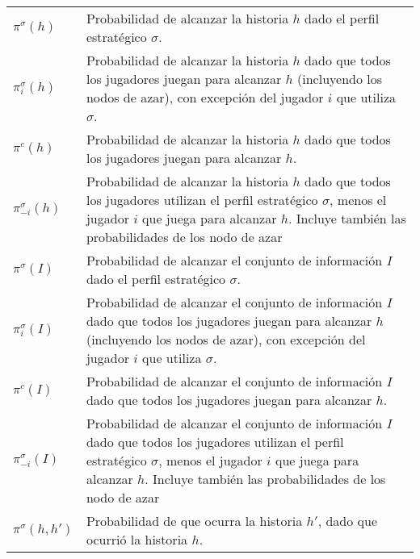 \begingroup
\renewcommand{\arraystretch}{1.5}
\begin{tabular}{l p{12cm}}
$\pi^{\sigma}(h)$ & Probabilidad de alcanzar la historia $h$ dado el perfil estratégico $\sigma$. \\
$\pi^{\sigma}_i(h)$ & Probabilidad de alcanzar la historia $h$ dado que todos los jugadores juegan para alcanzar $h$ (incluyendo los nodos de azar), con excepción del jugador $i$ que utiliza $\sigma$. \\
$\pi^c(h)$ & Probabilidad de alcanzar la historia $h$ dado que todos los jugadores juegan para alcanzar $h$. \\
$\pi^{\sigma}_{-i}(h)$ & Probabilidad de alcanzar la historia $h$ dado que todos los jugadores utilizan el perfil estratégico $\sigma$, menos el jugador $i$ que juega para alcanzar $h$. Incluye también las probabilidades de los nodo de azar \\
$\pi^{\sigma}(I)$ & Probabilidad de alcanzar el conjunto de información $I$ dado el perfil estratégico $\sigma$. \\
$\pi^{\sigma}_i(I)$ & Probabilidad de alcanzar el conjunto de información $I$ dado que todos los jugadores juegan para alcanzar $h$ (incluyendo los nodos de azar), con excepción del jugador $i$ que utiliza $\sigma$. \\
$\pi^c(I)$ & Probabilidad de alcanzar el conjunto de información $I$ dado que todos los jugadores juegan para alcanzar $h$. \\
$\pi^{\sigma}_{-i}(I)$ & Probabilidad de alcanzar el conjunto de información $I$ dado que todos los jugadores utilizan el perfil estratégico $\sigma$, menos el jugador $i$ que juega para alcanzar $h$. Incluye también las probabilidades de los nodo de azar \\
$\pi^{\sigma}(h, h')$ & Probabilidad de que ocurra la historia $h'$, dado que ocurrió la historia $h$. \\
\end{tabular}
\endgroup
